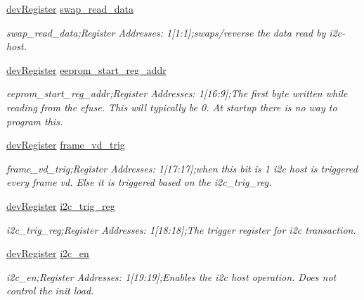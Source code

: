 \begin{DoxyCompactItemize}
\mbox{\hyperlink{classdev_register}{dev\+Register}} \mbox{\hyperlink{class_o_p_t3101_registers_af407d20259e48b205156afa37dc9ec89}{swap\+\_\+read\+\_\+data}}
\begin{DoxyCompactList}\small\item\em swap\+\_\+read\+\_\+data;Register Addresses\+: 1\mbox{[}1\+:1\mbox{]};swaps/reverse the data read by i2c-\/host. \end{DoxyCompactList}\item 
\mbox{\hyperlink{classdev_register}{dev\+Register}} \mbox{\hyperlink{class_o_p_t3101_registers_a862b136ce7f6fec789152e29f6ecde14}{eeprom\+\_\+start\+\_\+reg\+\_\+addr}}
\begin{DoxyCompactList}\small\item\em eeprom\+\_\+start\+\_\+reg\+\_\+addr;Register Addresses\+: 1\mbox{[}16\+:9\mbox{]};The first byte written while reading from the efuse. This will typically be 0. At startup there is no way to program this. \end{DoxyCompactList}\item 
\mbox{\hyperlink{classdev_register}{dev\+Register}} \mbox{\hyperlink{class_o_p_t3101_registers_a82583d9913fb9594494f5fb0a7736a5b}{frame\+\_\+vd\+\_\+trig}}
\begin{DoxyCompactList}\small\item\em frame\+\_\+vd\+\_\+trig;Register Addresses\+: 1\mbox{[}17\+:17\mbox{]};when this bit is \textquotesingle{}1\textquotesingle{} i2c host is triggered every frame vd. Else it is triggered based on the i2c\+\_\+trig\+\_\+reg. \end{DoxyCompactList}\item 
\mbox{\hyperlink{classdev_register}{dev\+Register}} \mbox{\hyperlink{class_o_p_t3101_registers_af75c9e118c738d3f61c4a8300854e119}{i2c\+\_\+trig\+\_\+reg}}
\begin{DoxyCompactList}\small\item\em i2c\+\_\+trig\+\_\+reg;Register Addresses\+: 1\mbox{[}18\+:18\mbox{]};The trigger register for i2c transaction. \end{DoxyCompactList}\item 
\mbox{\hyperlink{classdev_register}{dev\+Register}} \mbox{\hyperlink{class_o_p_t3101_registers_aece5a9388c2376cec5f2d881449bab1b}{i2c\+\_\+en}}
\begin{DoxyCompactList}\small\item\em i2c\+\_\+en;Register Addresses\+: 1\mbox{[}19\+:19\mbox{]};Enables the i2c host operation. Does not control the init load. \end{DoxyCompactList}\item 

\end{DoxyCompactItemize}

